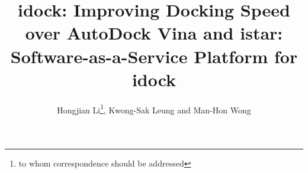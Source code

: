 \documentclass{bioinfo}
\begin{document}

\title[idock and istar]{idock: Improving Docking Speed over AutoDock Vina and istar: Software-as-a-Service Platform for idock}
\author[Hongjian Li \textit{et~al}]{Hongjian Li\footnote{to whom correspondence should be addressed}, Kwong-Sak Leung and Man-Hon Wong}
\address{Department of Computer Science and Engineering, Chinese University of Hong Kong, Shatin, New Territories, Hong Kong, China}



\maketitle
\end{document}
